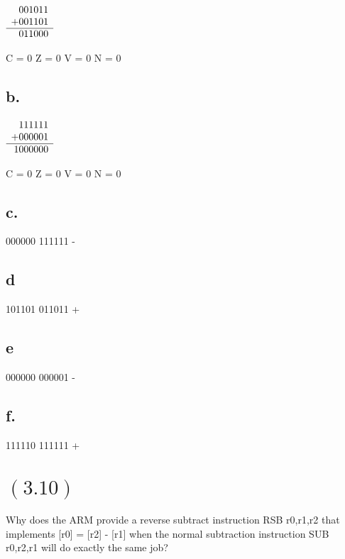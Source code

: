\documentclass[letterpaper,12pt,titlepage]{article}
\begin{document}
$\begin{array}[t]{r}
   001011 \\
  +001101 \\\hline
   011000 \\
\end{array}$

\begin{mdframed}[style=MyFrame]

C = 0
Z = 0
V = 0
N = 0

\end{mdframed}

\subsection*{b.}

$\begin{array}[t]{r}
   111111 \\
  +000001 \\\hline
  1000000 \\
\end{array}$

\begin{mdframed}[style=MyFrame]

C = 0
Z = 0
V = 0
N = 0

\end{mdframed}

\subsection*{c.}

000000
111111
-

\subsection*{d}

101101
011011
+

\subsection*{e}

000000
000001
-

\subsection*{f.}

111110
111111
+

\section*{$(3.10)$} Why does the ARM provide a reverse subtract instruction RSB r0,r1,r2 that implements [r0] = [r2] - [r1] when the normal subtraction instruction SUB r0,r2,r1 will do exactly the same job?
\end{document}
